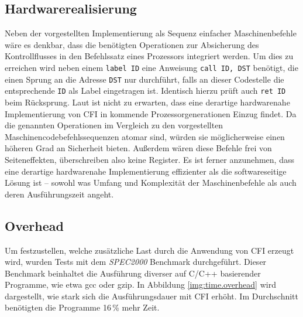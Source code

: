 \subsection{Hardwarerealisierung}

Neben der vorgestellten Implementierung als Sequenz einfacher Maschinenbefehle wäre es denkbar, dass die benötigten Operationen zur Absicherung des Kontrollflusses in den Befehlssatz eines Prozessors integriert werden. Um dies zu erreichen wird neben einem \texttt{label ID} eine Anweisung \texttt{call ID, DST} benötigt, die einen Sprung an die Adresse \texttt{DST} nur durchführt, falls an dieser Codestelle die entsprechende \texttt{ID} als Label eingetragen ist. Identisch hierzu prüft auch \texttt{ret ID} beim Rücksprung. Laut \cite[S.9]{Abadi.2009} ist nicht zu erwarten, dass eine derartige hardwarenahe Implementierung von CFI in kommende Prozessorgenerationen Einzug findet. Da die genannten Operationen im Vergleich zu den vorgestellten Maschinencodebefehlssequenzen atomar sind, würden sie möglicherweise einen höheren Grad an Sicherheit bieten. Außerdem wären diese Befehle frei von Seiteneffekten, überschreiben also keine Register. Es ist ferner anzunehmen, dass eine derartige hardwarenahe Implementierung effizienter als die softwareseitige Lösung ist -- sowohl was Umfang und Komplexität der Maschinenbefehle als auch deren Ausführungszeit angeht.

\subsection{Overhead}
\label{sec:overhead}


Um festzustellen, welche zusätzliche Last durch die Anwendung von CFI erzeugt wird, wurden Tests mit dem \emph{SPEC2000} Benchmark durchgeführt. Dieser Benchmark beinhaltet die Ausführung diverser auf C/C++ basierender Programme, wie etwa gcc oder gzip. In Abbildung \ref{img:time.overhead} wird dargestellt, wie stark sich die Ausführungsdauer mit CFI erhöht. Im Durchschnitt benötigten die Programme 16\,\% mehr Zeit.


